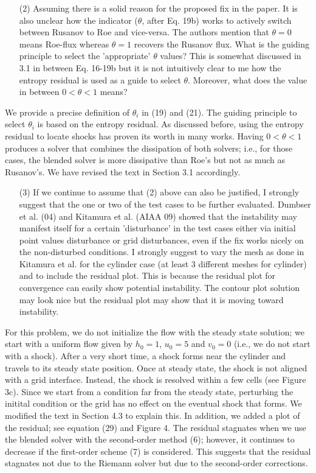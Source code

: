 \documentclass[english,11pt]{article}
\begin{document}
\bigskip
{\color{red}
  \begin{itemize}
  \item[(2)]
    Assuming there is a solid reason for the proposed fix in the paper. It is also unclear how the indicator
    ($\theta$, after Eq. 19b) works to actively switch between Rusanov to Roe and vice-versa. The authors
    mention that $\theta=0$ means Roe-flux whereas $\theta=1$ recovers the Rusanov flux. What is the guiding
    principle to select the 'appropriate' $\theta$ values? This is somewhat discussed in 3.1 in between Eq. 
    16-19b but it is not intuitively clear to me how the entropy residual is used as a guide to select $\theta$.
    Moreover, what does the value in between $0<\theta<1$ means?
  \end{itemize}
}
\noindent
We provide a precise definition of $\theta_i$ in (19) and (21). The guiding principle to select $\theta_i$
is based on the entropy residual. As discussed before, using the entropy residual to locate shocks has proven
its worth in many works. 
Having $0<\theta<1$ produces a solver that combines the dissipation of both solvers; i.e.,
for those cases, the blended solver is more dissipative than Roe's but not as much as Rusanov's. 
We have revised the text in Section 3.1 accordingly. 

\bigskip
{\color{red}
  \begin{itemize}
  \item[(3)]
    If we continue to assume that (2) above can also be justified, I strongly suggest that the one or two of
    the test cases to be further evaluated. Dumbser et al. (04) and Kitamura et al. (AIAA 09) showed that the
    instability may manifest itself for a certain 'disturbance' in the test cases either via initial point values
    disturbance or grid disturbances, even if the fix works nicely on the non-disturbed conditions. I strongly
    suggest to vary the mesh as done in Kitamura et al. for the cylinder case (at least 3 different meshes for
    cylinder) and to include the residual plot. This is because the residual plot for convergence can easily show
    potential instability. The contour plot solution may look nice but the residual plot may show that it is
    moving toward instability.
  \end{itemize}
}
\noindent
For this problem, we do not initialize the flow with the steady state solution; we start
with a uniform flow given by $h_0=1$, $u_0=5$ and $v_0=0$ (i.e., we do not start with a shock).
After a very short time, a shock forms near the cylinder and travels to its steady state position.
Once at steady state, the shock is not aligned with a grid interface. Instead, the 
shock is resolved within a few cells (see Figure 3c). 
Since we start from a condition far from the steady state, 
perturbing the initital condition or the grid has no effect on the eventual shock that forms. We modified the text in
Section 4.3 to explain this.  In addition, we added a plot of the residual; see equation (29) and 
Figure 4. 
The residual stagnates when we use the blended solver with the second-order method (6); however, it 
continues to decrease if the first-order scheme (7) is considered. This suggests that the residual stagnates 
not due to the Riemann solver but due to the second-order corrections. 
\end{document}
